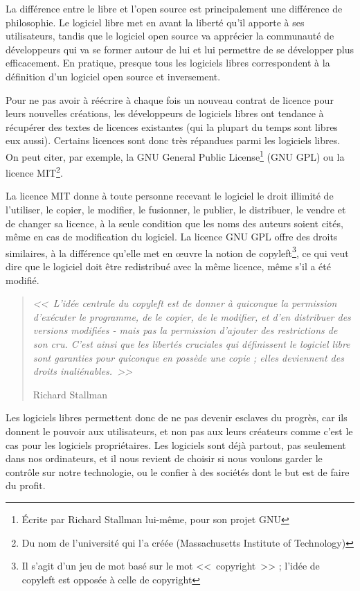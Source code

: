 La différence entre le libre et l'open source est principalement une différence de philosophie.
Le logiciel libre met en avant la liberté qu'il apporte à ses utilisateurs, tandis que le logiciel open source va apprécier la communauté de développeurs qui va se former autour de lui et lui permettre de se développer plus efficacement.
En pratique, presque tous les logiciels libres correspondent à la définition d'un logiciel open source et inversement.

Pour ne pas avoir à réécrire à chaque fois un nouveau contrat de licence pour leurs nouvelles créations, les développeurs de logiciels libres ont tendance à récupérer des textes de licences existantes (qui la plupart du temps sont libres eux aussi).
Certains licences sont donc très répandues parmi les logiciels libres.
On peut citer, par exemple, la GNU General Public License\footnote{Écrite par Richard Stallman lui-même, pour son projet GNU} (GNU GPL) ou la licence MIT\footnote{Du nom de l'université qui l'a créée (Massachusetts Institute of Technology)}.

La licence MIT donne à toute personne recevant le logiciel le droit illimité de l'utiliser, le copier, le modifier, le fusionner, le publier, le distribuer, le vendre et de changer sa licence, à la seule condition que les noms des auteurs soient cités, même en cas de modification du logiciel.
La licence GNU GPL offre des droits similaires, à la différence qu'elle met en œuvre la notion de copyleft\footnote{Il s'agit d'un jeu de mot basé sur le mot <<~copyright~>> ; l'idée de copyleft est opposée à celle de copyright}, ce qui veut dire que le logiciel doit être redistribué avec la même licence, même s'il a été modifié.

\begin{quotation}
\textit{<<~L'idée centrale du copyleft est de donner à quiconque la permission d'exécuter le programme, de le copier, de le modifier, et d'en distribuer des versions modifiées - mais pas la permission d'ajouter des restrictions de son cru. C'est ainsi que les libertés cruciales qui définissent le logiciel libre sont garanties pour quiconque en possède une copie ; elles deviennent des droits inaliénables.~>>}
\begin{flushright}Richard Stallman\end{flushright}
\end{quotation}

Les logiciels libres permettent donc de ne pas devenir esclaves du progrès, car ils donnent le pouvoir aux utilisateurs, et non pas aux leurs créateurs comme c'est le cas pour les logiciels propriétaires.
Les logiciels sont déjà partout, pas seulement dans nos ordinateurs, et il nous revient de choisir si nous voulons garder le contrôle sur notre technologie, ou le confier à des sociétés dont le but est de faire du profit.

